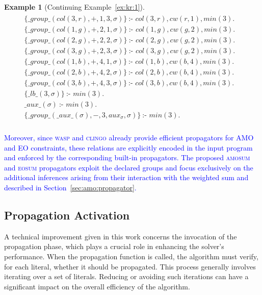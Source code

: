 \documentclass[preprint,authoryear]{elsarticle}
\theoremstyle{definition}
\newtheorem{example}{Example}[section]
\begin{document}
\begin{example}[Continuing Example~\ref{ex:kr:1}]
{\begin{align*}
\begin{array}{rr}
        \{\mathit{\_group\_}(\mathit{col}(3, r), + , 1, 3, \sigma)\}\ \text{:- } \mathit{col}(3, r), cw(r,1), \mathit{min}(3).\\
        \{\mathit{\_group\_}(\mathit{col}(1, g), + , 2, 1, \sigma)\}\ \text{:- } \mathit{col}(1, g), cw(g,2), \mathit{min}(3).\\
        \{\mathit{\_group\_}(\mathit{col}(2, g), + , 2, 2, \sigma)\}\ \text{:- } \mathit{col}(2, g), cw(g,2), \mathit{min}(3).\\
        \{\mathit{\_group\_}(\mathit{col}(3, g), + , 2, 3, \sigma)\}\ \text{:- } \mathit{col}(3, g), cw(g,2), \mathit{min}(3).\\
        \{\mathit{\_group\_}(\mathit{col}(1, b), + , 4, 1, \sigma)\}\ \text{:- } \mathit{col}(1, b), cw(b,4), \mathit{min}(3).\\
        \{\mathit{\_group\_}(\mathit{col}(2, b), + , 4, 2, \sigma)\}\ \text{:- } \mathit{col}(2, b), cw(b,4), \mathit{min}(3).\\
        \{\mathit{\_group\_}(\mathit{col}(3, b), + , 4, 3, \sigma)\}\ \text{:- } \mathit{col}(3, b), cw(b,4), \mathit{min}(3).\\
        \{\mathit{\_lb\_}(3, \sigma)\}\ \text{:- } \mathit{min}(3). & \\
        \mathit{\_aux\_}(\sigma)\ \text{:- } \mathit{min}(3).& \\
        \{\mathit{\_group\_}(\mathit{\_aux\_}(\sigma), -, 3, \mathit{aux}_\sigma,\sigma)\}\ \text{:- } \mathit{min}(3). & \\
    \end{array}
    \end{align*}
    }
\end{example}

\textcolor{blue}{Moreover, since \textsc{wasp} and \textsc{clingo} already provide efficient propagators for AMO and EO constraints, these relations are explicitly encoded in the input program and enforced by the corresponding built-in propagators. The proposed \textsc{amosum} and \textsc{eosum} propagators exploit the declared groups and focus exclusively on the additional inferences arising from their interaction with the weighted sum and described in Section~\ref{sec:amo:propagator}.}

\subsection{Propagation Activation}
\label{sub:sec:prop:act}
A technical improvement given in this work concerns the invocation of the propagation phase, which plays a crucial role in enhancing the solver's performance.
When the propagation function is called, the algorithm must verify, for each literal, whether it should be propagated. This process generally involves iterating over a set of literals.
Reducing or avoiding such iterations can have a significant impact on the overall efficiency of the algorithm.
\end{document}

